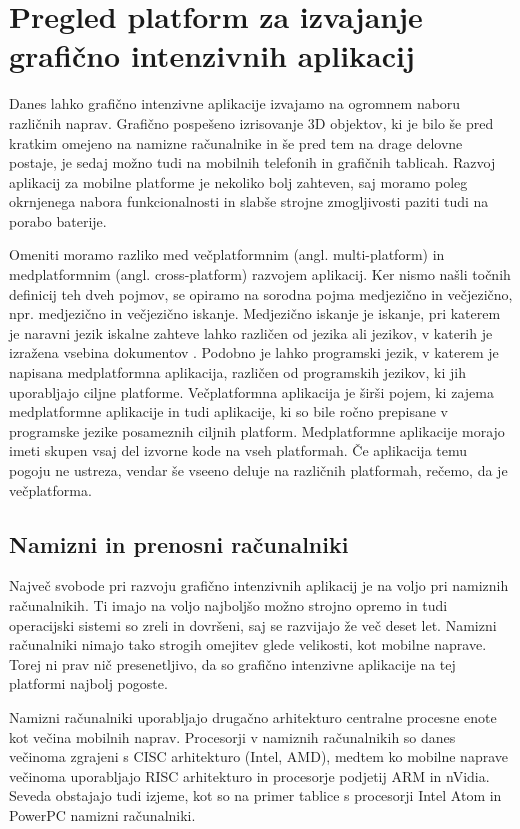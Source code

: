 \chapter{Pregled platform za izvajanje grafično intenzivnih aplikacij}

Danes lahko grafično intenzivne aplikacije izvajamo na ogromnem naboru različnih naprav. Grafično pospešeno izrisovanje 3D objektov, ki je bilo še pred kratkim omejeno na namizne računalnike in še pred tem na drage delovne postaje, je sedaj možno tudi na mobilnih telefonih in grafičnih tablicah. Razvoj aplikacij za mobilne platforme je nekoliko bolj zahteven, saj moramo poleg okrnjenega nabora funkcionalnosti in slabše strojne zmogljivosti paziti tudi na porabo baterije.

Omeniti moramo razliko med večplatformnim (angl. multi-platform) in medplatformnim (angl. cross-platform) razvojem aplikacij. Ker nismo našli točnih definicij teh dveh pojmov, se opiramo na sorodna pojma medjezično in večjezično, npr. medjezično in večjezično iskanje. Medjezično iskanje je iskanje, pri katerem je naravni jezik iskalne zahteve lahko različen od jezika ali jezikov, v katerih je izražena vsebina dokumentov \cite{jezicno}. Podobno je lahko programski jezik, v katerem je napisana medplatformna aplikacija, različen od programskih jezikov, ki jih uporabljajo ciljne platforme. Večplatformna aplikacija je širši pojem, ki zajema medplatformne aplikacije in tudi aplikacije, ki so bile ročno prepisane v programske jezike posameznih ciljnih platform. Medplatformne aplikacije morajo imeti skupen vsaj del izvorne kode na vseh platformah. Če aplikacija temu pogoju ne ustreza, vendar še vseeno deluje na različnih platformah, rečemo, da je večplatforma.

\section{Namizni in prenosni računalniki}

Največ svobode pri razvoju grafično intenzivnih aplikacij je na voljo pri namiznih računalnikih. Ti imajo na voljo najboljšo možno strojno opremo in tudi operacijski sistemi so zreli in dovršeni, saj se razvijajo že več deset let. Namizni računalniki nimajo tako strogih omejitev glede velikosti, kot mobilne naprave. Torej ni prav nič presenetljivo, da so grafično intenzivne aplikacije na tej platformi najbolj pogoste. 

Namizni računalniki uporabljajo drugačno arhitekturo centralne procesne enote kot večina mobilnih naprav. Procesorji v namiznih računalnikih so danes večinoma  zgrajeni s CISC arhitekturo (Intel, AMD), medtem ko mobilne naprave večinoma uporabljajo RISC arhitekturo in procesorje podjetij ARM in nVidia. Seveda obstajajo tudi izjeme, kot so na primer tablice s procesorji Intel Atom in PowerPC namizni računalniki.  

